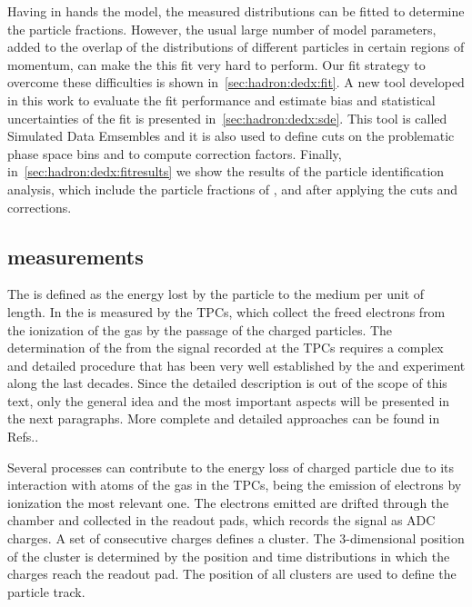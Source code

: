 Having in hands the \dedx model, the measured \dedx
distributions can be fitted to determine the particle
fractions. However, the usual large number of
model parameters, added to the
overlap of the \dedx distributions
of different particles in certain regions of momentum,
can make the this fit very hard to perform.
Our fit strategy to overcome these difficulties is shown
in~\cref{sec:hadron:dedx:fit}. A new tool
developed in this work to evaluate the fit performance
and estimate bias and statistical uncertainties of the fit
is presented in~\cref{sec:hadron:dedx:sde}. This
tool is called Simulated Data Emsembles and
it is also used to define cuts on the problematic
phase space bins and to compute correction factors.
Finally, in~\cref{sec:hadron:dedx:fitresults} we show the results
of the particle identification analysis, which include
the particle fractions of \pions, \kaons and \protons
after applying the cuts and corrections.


\subsection{\dedx measurements}
\label{sec:hadron:dedx:meas}


The \dedx is defined as the energy lost by the
particle to the medium per unit of length. 
In \NASixtyOne the \dedx is measured by the TPCs, which collect the 
freed electrons from the ionization of the gas by the passage of the charged particles.
The determination of the \dedx from the signal recorded at the TPCs requires a complex and
detailed procedure that has been very well established by the \NAFortyNine and \NASixtyOne
experiment along the last decades. Since the detailed description 
is out of the scope of this text, only the general idea and the most important aspects
will be presented in the next paragraphs. More complete and detailed approaches
can be found in Refs.\cite{BlumBook,LeeuwenThesis,GaborVeresThesis}.

Several processes can contribute to the energy loss of charged particle due to
its interaction with atoms of the gas in the TPCs, being the emission of
electrons by ionization the most relevant one. The electrons emitted are
drifted through the chamber and collected in the readout pads, which records
the signal as ADC charges. A set of consecutive charges defines a cluster.
The 3-dimensional position of the cluster is determined by the position
and time distributions in which the charges reach the readout pad.
The position of all clusters are used to define the particle track.

